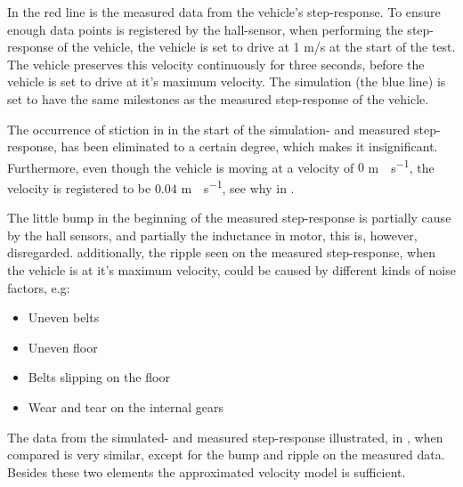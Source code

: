 In  the red line is the measured data from the vehicle's step-response. To ensure enough data points is registered by the hall-sensor, when performing the step-response of the vehicle, the vehicle is set to drive at 1 m/s at the start of the test. The vehicle preserves this velocity continuously for three seconds, before the vehicle is set to drive at it's maximum velocity. The simulation (the blue line) is set to have the same milestones as the measured step-response of the vehicle. 

The occurrence of stiction in in the start of the simulation- and measured step-response, has been eliminated to a certain degree, which makes it insignificant. Furthermore, even though the vehicle is moving at a velocity of $0$ \si{m \cdot s^{-1}}, the velocity is registered to be $0.04$ \si{m \cdot s^{-1}}, see why in . 

The little bump in the beginning of the measured step-response is partially cause by the hall sensors, and partially the inductance in motor, this is, however, disregarded. additionally, the ripple seen on the measured step-response, when the vehicle is at it's maximum velocity, could be caused by different kinds of noise factors, e.g:

\begin{itemize}
\item Uneven belts 
\item Uneven floor
\item Belts slipping on the floor
\item Wear and tear on the internal gears
\end{itemize}

The data from the simulated- and measured step-response illustrated, in , when compared is very similar, except for the bump and ripple on the measured data. Besides these two elements the approximated velocity model is sufficient.